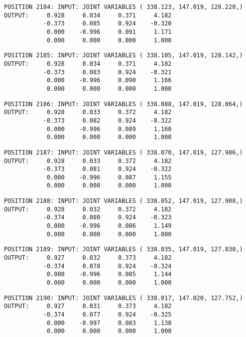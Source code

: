 \begin{verbatim}
POSITION 2184: INPUT: JOINT VARIABLES ( 338.123, 147.019, 128.220,)
OUTPUT:     0.928     0.034     0.371     4.182
           -0.373     0.085     0.924    -0.320
            0.000    -0.996     0.091     1.171
            0.000     0.000     0.000     1.000
\end{verbatim} \pagebreak[1]\begin{verbatim}
POSITION 2185: INPUT: JOINT VARIABLES ( 338.105, 147.019, 128.142,)
OUTPUT:     0.928     0.034     0.371     4.182
           -0.373     0.083     0.924    -0.321
            0.000    -0.996     0.090     1.166
            0.000     0.000     0.000     1.000
\end{verbatim} \pagebreak[1]\begin{verbatim}
POSITION 2186: INPUT: JOINT VARIABLES ( 338.088, 147.019, 128.064,)
OUTPUT:     0.928     0.033     0.372     4.182
           -0.373     0.082     0.924    -0.322
            0.000    -0.996     0.089     1.160
            0.000     0.000     0.000     1.000
\end{verbatim} \pagebreak[1]\begin{verbatim}
POSITION 2187: INPUT: JOINT VARIABLES ( 338.070, 147.019, 127.986,)
OUTPUT:     0.928     0.033     0.372     4.182
           -0.373     0.081     0.924    -0.322
            0.000    -0.996     0.087     1.155
            0.000     0.000     0.000     1.000
\end{verbatim} \pagebreak[1]\begin{verbatim}
POSITION 2188: INPUT: JOINT VARIABLES ( 338.052, 147.019, 127.908,)
OUTPUT:     0.928     0.032     0.372     4.182
           -0.374     0.080     0.924    -0.323
            0.000    -0.996     0.086     1.149
            0.000     0.000     0.000     1.000
\end{verbatim} \pagebreak[1]\begin{verbatim}
POSITION 2189: INPUT: JOINT VARIABLES ( 338.035, 147.019, 127.830,)
OUTPUT:     0.927     0.032     0.373     4.182
           -0.374     0.078     0.924    -0.324
            0.000    -0.996     0.085     1.144
            0.000     0.000     0.000     1.000
\end{verbatim} \pagebreak[1]\begin{verbatim}
POSITION 2190: INPUT: JOINT VARIABLES ( 338.017, 147.020, 127.752,)
OUTPUT:     0.927     0.031     0.373     4.182
           -0.374     0.077     0.924    -0.325
            0.000    -0.997     0.083     1.138
            0.000     0.000     0.000     1.000
\end{verbatim} \pagebreak[1]\begin{verbatim}

\end{verbatim}
